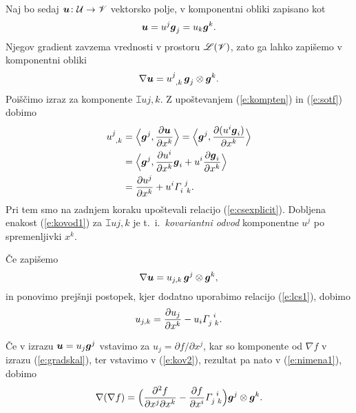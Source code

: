 Naj bo sedaj $\boldsymbol u\colon \mathcal U\to\mathscr V$ vektorsko polje, v komponentni obliki
zapisano kot
\[ \boldsymbol u=u^j\boldsymbol g_j=u_k\boldsymbol g^k. \]
Njegov gradient zavzema vrednosti v prostoru $\mathscr L(\mathscr V)$, zato ga lahko zapišemo v komponentni obliki
\begin{equation} \label{e:gradukomp}
	\nabla\vek{u}=\topbot{u}{j}{,k}\,\vek{g}_j\otimes\vek{g}^k.
\end{equation}
Poiščimo izraz za komponente $\topbot{u}{j}{,k}$. Z upoštevanjem
(\ref{e:kompten}) in (\ref{e:sotf}) dobimo
\begin{align}
	\topbot{u}{j}{,k}&=\Big<\vek{g}^j,\frac{\partial\vek{u}}{\partial x^k}\Big>=
	\Big<\vek{g}^j,\frac{\partial(u^i\vek{g}_i)}{\partial x^k}\Big> \nonumber \\
	&=\Big<\vek{g}^j,\frac{\partial u^i}{\partial x^k}\vek{g}_i+
	u^i\frac{\partial\vek{g}_i}{\partial x^k}\Big> \nonumber \\
	&=\frac{\partial u^j}{\partial x^k}+u^i\cs{i}{j}{k}. \label{e:kovod1}
\end{align}
Pri tem smo na zadnjem koraku upoštevali relacijo (\ref{e:csexplicit}). Dobljena enakost (\ref{e:kovod1})
za $\topbot{u}{j}{,k}$ je t.~i.~\emph{kovariantni odvod} komponentne $u^j$ po spremenljivki $x^k$.

Če zapišemo
\begin{equation} \label{e:nimena1}
	\nabla\boldsymbol u=u_{j,k}\,\boldsymbol g^j\otimes\boldsymbol g^k,
\end{equation}
in ponovimo prejšnji postopek, kjer dodatno uporabimo relacijo (\ref{e:lcs1}), dobimo
\begin{equation} \label{e:kov2}
	u_{j,k}=\frac{\partial u_j}{\partial x^k}-u_i\cs{j}{i}{k}.
\end{equation}
\begin{primer}
	Če v izrazu $\boldsymbol u=u_j\boldsymbol g^j$ vstavimo za $u_j=\partial f/\partial x^j$,
	kar so komponente od $\nabla f$ v izrazu (\ref{e:gradskal}), ter vstavimo v
	(\ref{e:kov2}), rezultat pa nato v (\ref{e:nimena1}), dobimo
	\begin{equation} \label{e:dvagrad}
		\nabla(\nabla f)=\Big(\frac{\partial^2 f}{\partial x^j\partial x^k}-
		\frac{\partial f}{\partial x^i}\cs{j}{i}{k}\Big)\vek{g}^j\otimes\vek{g}^k.
	\end{equation}
\end{primer}

